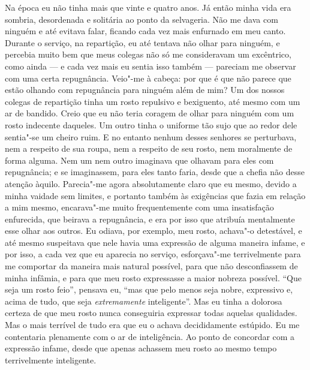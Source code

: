 Na época eu não tinha mais que vinte e quatro anos. Já então minha vida
era sombria, desordenada e solitária ao ponto da selvageria. Não me
dava com ninguém e até evitava falar, ficando cada vez mais enfurnado
em meu canto. Durante o serviço, na repartição, eu até tentava não
olhar para ninguém, e percebia muito bem que meus colegas não só me
consideravam um excêntrico, como ainda --- e cada vez mais eu sentia isso
também --- pareciam me observar com uma certa repugnância. Veio"-me à
cabeça: por que é que não parece que estão olhando com repugnância para
ninguém além de mim? Um dos nossos colegas de repartição tinha um rosto
repulsivo e bexiguento, até mesmo com um ar de bandido. Creio que eu
não teria coragem de olhar para ninguém com um rosto indecente
daqueles. Um outro tinha o uniforme tão sujo que ao redor dele
sentia"-se um cheiro ruim. E no entanto nenhum desses senhores se
perturbava, nem a respeito de sua roupa, nem a respeito de seu rosto,
nem moralmente de forma alguma. Nem um nem outro imaginava que olhavam
para eles com repugnância; e se imaginassem, para eles tanto faria,
desde que a chefia não desse atenção àquilo. Parecia"-me agora
absolutamente claro que eu mesmo, devido a minha vaidade sem limites, e
portanto também às exigências que fazia em relação a mim mesmo,
encarava"-me muito frequentemente com uma insatisfação enfurecida, que
beirava a repugnância, e era por isso que atribuía mentalmente esse
olhar aos outros. Eu odiava, por exemplo, meu rosto, achava"-o
detestável, e até mesmo suspeitava que nele havia uma expressão de
alguma maneira infame, e por isso, a cada vez que eu aparecia no
serviço, esforçava"-me terrivelmente para me comportar da maneira mais
natural possível, para que não desconfiassem de minha infâmia, e para
que meu rosto expressasse a maior nobreza possível. “Que seja um rosto
feio”, pensava eu, “mas que pelo menos seja nobre, expressivo e, acima
de tudo, que seja \textit{extremamente} inteligente”. Mas eu tinha a
dolorosa certeza de que meu rosto nunca conseguiria expressar todas
aquelas qualidades. Mas o mais terrível de tudo era que eu o achava
decididamente estúpido. Eu me contentaria plenamente com o ar de
inteligência. Ao ponto de concordar com a expressão infame, desde que
apenas achassem meu rosto ao mesmo tempo terrivelmente inteligente.

